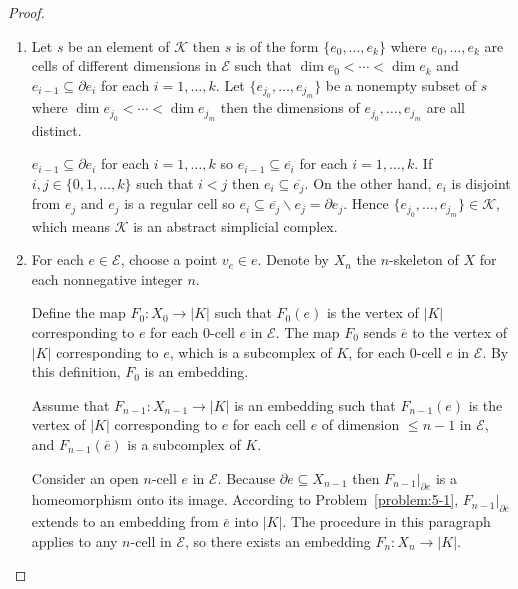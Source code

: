 \begin{proof}
	\begin{enumerate}[label={(\alph*)}]
		\item Let \( s \) be an element of \( \mathcal{K} \) then \( s \) is of the form \( \{ e_{0}, \ldots, e_{k} \} \) where \( e_{0}, \ldots, e_{k} \) are cells of different dimensions in \( \mathcal{E} \) such that \( \dim e_{0} < \cdots < \dim e_{k} \) and \( e_{i-1} \subseteq \partial e_{i} \) for each \( i = 1, \ldots, k \). Let \( \{ e_{j_{0}}, \ldots, e_{j_{m}} \} \) be a nonempty subset of \( s \) where \( \dim e_{j_{0}} < \cdots < \dim e_{j_{m}} \) then the dimensions of \( e_{j_{0}}, \ldots, e_{j_{m}} \) are all distinct.

		      \( e_{i-1} \subseteq \partial e_{i} \) for each \( i = 1, \ldots, k \) so \( e_{i-1} \subseteq \overline{e_{i}} \) for each \( i = 1, \ldots, k \). If \( i, j \in \{ 0, 1, \ldots, k \} \) such that \( i < j \) then \( e_{i} \subseteq \overline{e_{j}} \). On the other hand, \( e_{i} \) is disjoint from \( e_{j} \) and \( e_{j} \) is a regular cell so \( e_{i} \subseteq \overline{e_{j}}\smallsetminus e_{j} = \partial e_{j} \). Hence \( \{ e_{j_{0}}, \ldots, e_{j_{m}} \} \in \mathcal{K} \), which means \( \mathcal{K} \) is an abstract simplicial complex.
		\item For each \( e \in \mathcal{E} \), choose a point \( v_{e} \in e \). Denote by \( X_{n} \) the \( n \)-skeleton of \( X \) for each nonnegative integer \( n \).

		      Define the map \( F_{0}: X_{0} \to \left\vert K \right\vert \) such that \( F_{0}(e) \) is the vertex of \( \left\vert K \right\vert \) corresponding to \( e \) for each 0-cell \( e \) in \( \mathcal{E} \). The map \( F_{0} \) sends \( \overline{e} \) to the vertex of \( \left\vert K \right\vert \) corresponding to \( e \), which is a subcomplex of \( K \), for each 0-cell \( e \) in \( \mathcal{E} \). By this definition, \( F_{0} \) is an embedding.

		      Assume that \( F_{n-1}: X_{n-1} \to \left\vert K \right\vert \) is an embedding such that \( F_{n-1}(e) \) is the vertex of \( \left\vert K \right\vert \) corresponding to \( e \) for each cell \( e \) of dimension \( \leq n-1 \) in \( \mathcal{E} \), and \( F_{n-1}(\overline{e}) \) is a subcomplex of \( K \).

		      Consider an open \( n \)-cell \( e \) in \( \mathcal{E} \). Because \( \partial e \subseteq X_{n-1} \) then \( F_{n-1}\vert_{\partial e} \) is a homeomorphism onto its image. According to Problem~\ref{problem:5-1}, \( F_{n-1}\vert_{\partial e} \) extends to an embedding from \( \overline{e} \) into \( \left\vert K \right\vert \). The procedure in this paragraph applies to any \( n \)-cell in \( \mathcal{E} \), so there exists an embedding \( F_{n}: X_{n} \to \left\vert K \right\vert \).


\end{enumerate}
\end{proof}
